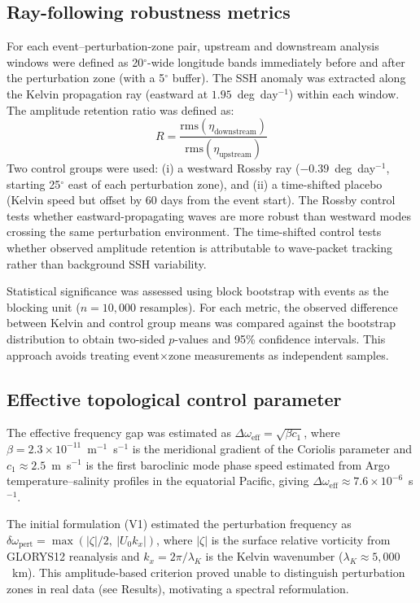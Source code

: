 \documentclass[11pt]{article}
\begin{document}
\subsection{Ray-following robustness metrics}

For each event--perturbation-zone pair, upstream and downstream analysis windows were defined as 20$^\circ$-wide longitude bands immediately before and after the perturbation zone (with a 5$^\circ$ buffer). The SSH anomaly was extracted along the Kelvin propagation ray (eastward at $1.95$~deg~day$^{-1}$) within each window. The amplitude retention ratio was defined as:
\begin{equation}
R = \frac{\mathrm{rms}(\eta_\mathrm{downstream})}{\mathrm{rms}(\eta_\mathrm{upstream})}
\end{equation}
Two control groups were used: (i) a westward Rossby ray ($-0.39$~deg~day$^{-1}$, starting 25$^\circ$ east of each perturbation zone), and (ii) a time-shifted placebo (Kelvin speed but offset by 60 days from the event start). The Rossby control tests whether eastward-propagating waves are more robust than westward modes crossing the same perturbation environment. The time-shifted control tests whether observed amplitude retention is attributable to wave-packet tracking rather than background SSH variability.

Statistical significance was assessed using block bootstrap with events as the blocking unit ($n = 10{,}000$ resamples). For each metric, the observed difference between Kelvin and control group means was compared against the bootstrap distribution to obtain two-sided $p$-values and 95\% confidence intervals. This approach avoids treating event$\times$zone measurements as independent samples.

\subsection{Effective topological control parameter}

The effective frequency gap was estimated as $\Delta\omega_\mathrm{eff} = \sqrt{\beta c_1}$, where $\beta = 2.3 \times 10^{-11}$~m$^{-1}$~s$^{-1}$ is the meridional gradient of the Coriolis parameter and $c_1 \approx 2.5$~m~s$^{-1}$ is the first baroclinic mode phase speed estimated from Argo temperature--salinity profiles\cite{Roemmich2009} in the equatorial Pacific, giving $\Delta\omega_\mathrm{eff} \approx 7.6 \times 10^{-6}$~s$^{-1}$.

The initial formulation (V1) estimated the perturbation frequency as $\delta\omega_\mathrm{pert} = \max(|\zeta|/2,\ |U_0 k_x|)$, where $|\zeta|$ is the surface relative vorticity from GLORYS12 reanalysis and $k_x = 2\pi / \lambda_K$ is the Kelvin wavenumber ($\lambda_K \approx 5{,}000$~km). This amplitude-based criterion proved unable to distinguish perturbation zones in real data (see Results), motivating a spectral reformulation.
\end{document}
